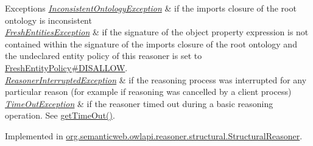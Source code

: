 \begin{DoxyExceptions}{Exceptions}
{\em \hyperlink{classorg_1_1semanticweb_1_1owlapi_1_1reasoner_1_1_inconsistent_ontology_exception}{Inconsistent\-Ontology\-Exception}} & if the imports closure of the root ontology is inconsistent \\
\hline
{\em \hyperlink{classorg_1_1semanticweb_1_1owlapi_1_1reasoner_1_1_fresh_entities_exception}{Fresh\-Entities\-Exception}} & if the signature of the object property expression is not contained within the signature of the imports closure of the root ontology and the undeclared entity policy of this reasoner is set to \hyperlink{enumorg_1_1semanticweb_1_1owlapi_1_1reasoner_1_1_fresh_entity_policy_a762eae6d5b2449d125311ecaabfdc8d0}{Fresh\-Entity\-Policy\#\-D\-I\-S\-A\-L\-L\-O\-W}. \\
\hline
{\em \hyperlink{classorg_1_1semanticweb_1_1owlapi_1_1reasoner_1_1_reasoner_interrupted_exception}{Reasoner\-Interrupted\-Exception}} & if the reasoning process was interrupted for any particular reason (for example if reasoning was cancelled by a client process) \\
\hline
{\em \hyperlink{classorg_1_1semanticweb_1_1owlapi_1_1reasoner_1_1_time_out_exception}{Time\-Out\-Exception}} & if the reasoner timed out during a basic reasoning operation. See \hyperlink{interfaceorg_1_1semanticweb_1_1owlapi_1_1reasoner_1_1_o_w_l_reasoner_a44b2c968f989afe5290db29c90faa164}{get\-Time\-Out()}. \\
\hline
\end{DoxyExceptions}


Implemented in \hyperlink{classorg_1_1semanticweb_1_1owlapi_1_1reasoner_1_1structural_1_1_structural_reasoner_a64341c775b8b42a495bba21cf8fa7b33}{org.\-semanticweb.\-owlapi.\-reasoner.\-structural.\-Structural\-Reasoner}.

